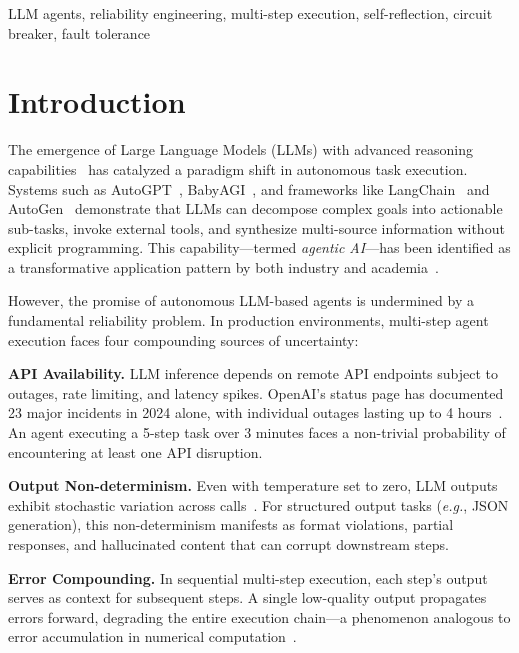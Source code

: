 \documentclass[conference]{IEEEtran}
\newcommand{\eg}{\textit{e.g.}}
\begin{document}
\begin{IEEEkeywords}
LLM agents, reliability engineering, multi-step execution, self-reflection, circuit breaker, fault tolerance
\end{IEEEkeywords}

\section{Introduction}

The emergence of Large Language Models (LLMs) with advanced reasoning capabilities~\cite{openai2024gpt4o, anthropic2024claude} has catalyzed a paradigm shift in autonomous task execution. Systems such as AutoGPT~\cite{autogpt2023}, BabyAGI~\cite{babyagi2023}, and frameworks like LangChain~\cite{chase2023langchain} and AutoGen~\cite{wu2023autogen} demonstrate that LLMs can decompose complex goals into actionable sub-tasks, invoke external tools, and synthesize multi-source information without explicit programming. This capability---termed \textit{agentic AI}---has been identified as a transformative application pattern by both industry and academia~\cite{wang2023survey, xi2023rise}.

However, the promise of autonomous LLM-based agents is undermined by a fundamental reliability problem. In production environments, multi-step agent execution faces four compounding sources of uncertainty:

\textbf{API Availability.} LLM inference depends on remote API endpoints subject to outages, rate limiting, and latency spikes. OpenAI's status page has documented 23 major incidents in 2024 alone, with individual outages lasting up to 4 hours~\cite{openai_status2024}. An agent executing a 5-step task over 3 minutes faces a non-trivial probability of encountering at least one API disruption.

\textbf{Output Non-determinism.} Even with temperature set to zero, LLM outputs exhibit stochastic variation across calls~\cite{ouyang2023llm_determinism}. For structured output tasks (\eg, JSON generation), this non-determinism manifests as format violations, partial responses, and hallucinated content that can corrupt downstream steps.

\textbf{Error Compounding.} In sequential multi-step execution, each step's output serves as context for subsequent steps. A single low-quality output propagates errors forward, degrading the entire execution chain---a phenomenon analogous to error accumulation in numerical computation~\cite{wei2022chain}.
\end{document}
